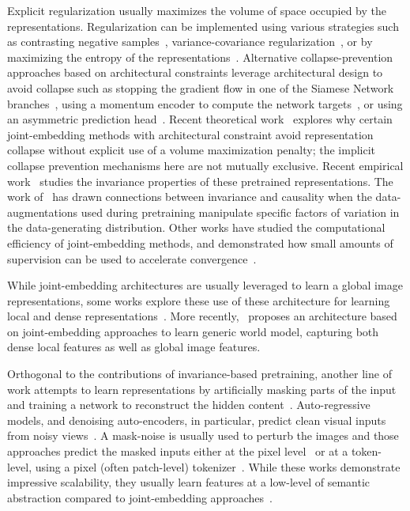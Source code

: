 \documentclass{article} %
\begin{document}
Explicit regularization usually maximizes the volume of space occupied by the representations. Regularization can be implemented using various strategies such as contrasting negative samples~\citep{bromley1993signature,he2019moco,chen2020simple}, variance-covariance regularization~\citep{bardes2021vicreg, zbontar2021barlow}, or by maximizing the entropy of the representations~\citep{asano2019self,caron2020unsupervised,caron2021emerging,assran2021semi,assran2022masked}.
Alternative collapse-prevention approaches based on architectural constraints leverage architectural design to avoid collapse such as stopping the gradient flow in one of the Siamese Network branches~\citep{chen2020simple}, using a momentum encoder to compute the network targets~\citep{grill2020bootstrap}, or using an asymmetric prediction head~\citep{grill2020bootstrap, chen2020simple, baevski2022data2vec}.
Recent theoretical work~\citep{tian2021understanding} explores why certain joint-embedding methods with architectural constraint avoid representation collapse without explicit use of a volume maximization penalty; the implicit collapse prevention mechanisms here are not mutually exclusive.
Recent empirical work~\citep{bordes2022guillotine} studies the invariance properties of these pretrained representations.
The work of~\citet{mitrovic2020representation} has drawn connections between invariance and causality when the data-augmentations used during pretraining manipulate specific factors of variation in the data-generating distribution.
Other works have studied the computational efficiency of joint-embedding methods, and demonstrated how small amounts of supervision can be used to accelerate convergence~\citep{assran2020supervision}.

While joint-embedding architectures are usually leveraged to learn a global image representations, some works explore these use of these architecture for learning local and dense representations~\citep{chen2022intra,gidaris2020learning}.
More recently,~\citet{lecun2022path} proposes an architecture based on joint-embedding approaches to learn generic world model, capturing both dense local features as well as global image features.

Orthogonal to the contributions of invariance-based pretraining, another line of work attempts to learn representations by artificially masking parts of the input and training a network to reconstruct the hidden content~\citep{vincent2010stacked}.
Auto-regressive models, and denoising auto-encoders, in particular,  predict clean visual inputs from noisy views~\citep{chen2020generative,vincent2010stacked,he2021masked,bao2021beit,baevski2022data2vec}. A mask-noise is usually used to perturb the images and those approaches predict the masked inputs either at the pixel level~\citep{dosovitskiy2020image,he2021masked,xie2019unsupervised} or at a token-level, using a pixel (often patch-level) tokenizer~\citep{bao2021beit,wei2021masked}.
While these works demonstrate impressive scalability, they usually learn features at a low-level of semantic abstraction compared to joint-embedding approaches~\citep{assran2022masked}.
\end{document}

